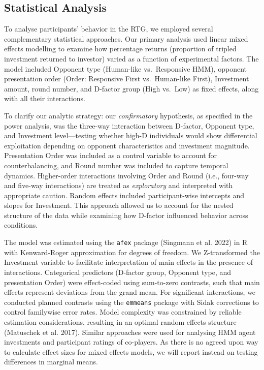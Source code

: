 \documentclass[
]{article}
\begin{document}
\subsection{Statistical Analysis}\label{statistical-analysis}

To analyse participants' behavior in the RTG, we employed several complementary statistical approaches.
Our primary analysis used linear mixed effects modelling to examine how percentage returns (proportion of tripled investment returned to investor) varied as a function of experimental factors.
The model included Opponent type (Human-like vs.~Responsive HMM), opponent presentation order (Order: Responsive First vs.~Human-like First), Investment amount, round number, and D-factor group (High vs.~Low) as fixed effects, along with all their interactions.

To clarify our analytic strategy: our \emph{confirmatory} hypothesis, as specified in the power analysis, was the three-way interaction between D-factor, Opponent type, and Investment level---testing whether high-D individuals would show differential exploitation depending on opponent characteristics and investment magnitude.
Presentation Order was included as a control variable to account for counterbalancing, and Round number was included to capture temporal dynamics.
Higher-order interactions involving Order and Round (i.e., four-way and five-way interactions) are treated as \emph{exploratory} and interpreted with appropriate caution.
Random effects included participant-wise intercepts and slopes for Investment.
This approach allowed us to account for the nested structure of the data while examining how D-factor influenced behavior across conditions.

The model was estimated using the \texttt{afex} package ({Singmann et al.} 2022) in R with Kenward-Roger approximation for degrees of freedom.
We Z-transformed the Investment variable to facilitate interpretation of main effects in the presence of interactions.
Categorical predictors (D-factor group, Opponent type, and presentation Order) were effect-coded using sum-to-zero contrasts, such that main effects represent deviations from the grand mean.
For significant interactions, we conducted planned contrasts using the \texttt{emmeans} package with Sidak corrections to control familywise error rates.
Model complexity was constrained by reliable estimation considerations, resulting in an optimal random effects structure (Matuschek et al. 2017).
Similar approaches were used for analysing HMM agent investments and participant ratings of co-players.
As there is no agreed upon way to calculate effect sizes for mixed effects models, we will report instead on testing differences in marginal means.
\end{document}
